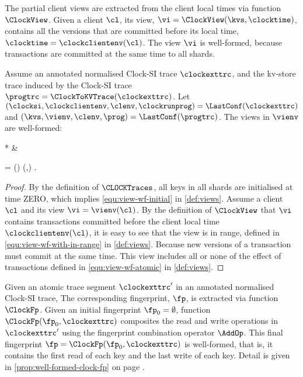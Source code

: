 The partial client views are extracted from the client local times via function \( \ClockView \).
Given a client \( \cl \), its view, \( \vi = \ClockView(\kvs,\clocktime) \), contains all the versions 
that are committed before its local time, \( \clocktime = \clockclientenv(\cl) \).
The view \( \vi \) is well-formed, because transactions are committed at the same time to all shards.

\begin{proposition}
\label{prop:clock-si-view}
Assume an annotated normalised Clock-SI trace \( \clockexttrc \),
and the kv-store trace induced by the Clock-SI trace \( \progtrc = \ClockToKVTrace(\clockexttrc) \).
Let \( (\clocksi,\clockclientenv,\clenv,\clockrunprog) = \LastConf(\clockexttrc) \)
and \( (\kvs,\vienv,\clenv,\prog) = \LastConf(\progtrc) \).
The views in \( \vienv \) are well-formed:
\begin{Formulae}*
& \begin{Formula}
   \Forall{\cl \in \Dom(\vienv) | \vi}
   \vi = \vienv(\cl) \implies \WfView(\kvs,\vi) .
\end{Formula}
\end{Formulae}
\end{proposition}
\begin{proof}
By the definition of \( \CLOCKTraces \), all keys in all shards are initialised at time ZERO,
which implies \cref{equ:view-wf-initial} in \cref{def:views}.
Assume a client \( \cl \) and its view \( \vi = \vienv(\cl) \).
By the definition of \( \ClockView \) that \( \vi \) contains transactions committed
before the client local time \( \clockclientenv(\cl) \), 
it is easy to see that the view is in range, defined in \cref{equ:view-wf-with-in-range} in \cref{def:views}.
Because new versions of a transaction must commit at the same time.
This view includes all or none of the effect of transactions defined in \cref{equ:view-wf-atomic} in \cref{def:views}.
\end{proof}

Given an atomic trace segment \( \clockexttrc' \) in an annotated normalised Clock-SI trace,
The corresponding fingerprint, \( \fp \), is extracted via function \( \ClockFp \).
Given an initial fingerprint \( \fp_0 = \emptyset \), 
function \( \ClockFp(\fp_0,\clockexttrc) \) 
composites the read and write operations in \( \clockexttrc' \) 
using the fingerprint combination operator \( \AddOp \).
This final fingerprint \( \fp = \ClockFp(\fp_0,\clockexttrc) \) is well-formed,
that is,
it contains the first read of each key and the last write of each key.
Detail is given in \cref{prop:well-formed-clock-fp} on page \pageref{sec:proof:clock-fp-well-formed}.

